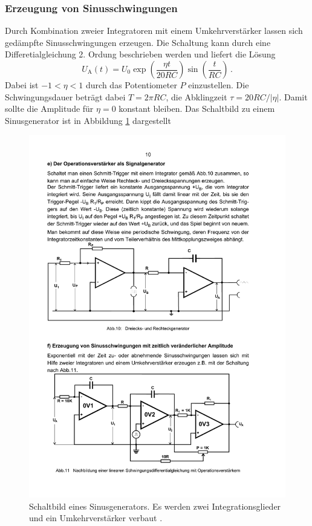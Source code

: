 \subsubsection{Erzeugung von Sinusschwingungen}
\label{subsubsec:sinusschwingungen}
Durch Kombination zweier Integratoren mit einem Umkehrverstärker lassen sich
gedämpfte Sinusschwingungen erzeugen.
Die Schaltung kann durch eine Differetialgleichung 2. Ordung beschrieben
werden und liefert die Lösung
\begin{equation*}
    U_\text{A}(t) = U_0 \exp\!\left( \frac{\eta t}{\num{20} RC} \right)
                        \sin\!\left( \frac{t}{RC} \right)\,.
\end{equation*}
Dabei ist $\num{-1} < \eta < \num{1}$ durch das Potentiometer $P$ einzustellen.
Die Schwingungsdauer beträgt dabei $T = 2\pi RC$, die Abklingzeit
$\tau = 20 RC / |\eta|$. Damit sollte die Amplitude für $\eta = \num{0}$
konstant bleiben.
Das Schaltbild zu einem Sinusgenerator ist in Abbildung \ref{fig:sinus}
dargestellt
\begin{figure}
    \centering
    \includegraphics[width=0.9\linewidth]{img/sinus.pdf}
    \caption{
        Schaltbild eines Sinusgenerators. Es werden zwei Integrationsglieder
        und ein Umkehrverstärker verbaut \cite{V51}.
    }
    \label{fig:sinus}
\end{figure}

\clearpage
